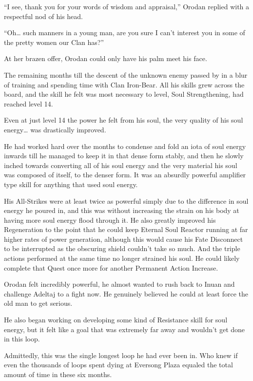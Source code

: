 \documentclass[a4paper,10pt]{book}
\begin{document}
“I see, thank you for your words of wisdom and appraisal,” Orodan replied with a respectful nod of his head.\par
“Oh… such manners in a young man, are you sure I can’t interest you in some of the pretty women our Clan has?”\par
At her brazen offer, Orodan could only have his palm meet his face.\par
\par
The remaining months till the descent of the unknown enemy passed by in a blur of training and spending time with Clan Iron-Bear. All his skills grew across the board, and the skill he felt was most necessary to level, Soul Strengthening, had reached level 14.\par
Even at just level 14 the power he felt from his soul, the very quality of his soul energy… was drastically improved.\par
He had worked hard over the months to condense and fold an iota of soul energy inwards till he managed to keep it in that dense form stably, and then he slowly inched towards converting all of his soul energy and the very material his soul was composed of itself, to the denser form. It was an absurdly powerful amplifier type skill for anything that used soul energy.\par
His All-Strikes were at least twice as powerful simply due to the difference in soul energy he poured in, and this was without increasing the strain on his body at having more soul energy flood through it. He also greatly improved his Regeneration to the point that he could keep Eternal Soul Reactor running at far higher rates of power generation, although this would cause his Fate Disconnect to be interrupted as the obscuring shield couldn’t take so much. And the triple actions performed at the same time no longer strained his soul. He could likely complete that Quest once more for another Permanent Action Increase.\par
Orodan felt incredibly powerful, he almost wanted to rush back to Inuan and challenge Adeltaj to a fight now. He genuinely believed he could at least force the old man to get serious.\par
He also began working on developing some kind of Resistance skill for soul energy, but it felt like a goal that was extremely far away and wouldn’t get done in this loop.\par
Admittedly, this was the single longest loop he had ever been in. Who knew if even the thousands of loops spent dying at Eversong Plaza equaled the total amount of time in these six months.\par
\end{document}
